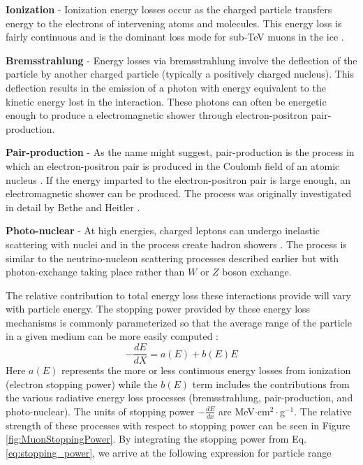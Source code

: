 \documentclass{gatech-thesis}
\begin{document}
\begin{adjustwidth}{2.5em}{2.5em}
\setlength{\parindent}{0pt}
\textbf{Ionization} - Ionization energy losses occur as the charged particle transfers energy to the electrons of intervening atoms and molecules. This energy loss is fairly continuous and is the dominant loss mode for sub-TeV muons in the ice \cite{2001ADNDT..78..183G}.

\textbf{Bremsstrahlung} - Energy losses via bremsstrahlung involve the deflection of the particle by another charged particle (typically a positively charged nucleus). This deflection results in the emission of a photon with energy equivalent to the kinetic energy lost in the interaction. These photons can often be energetic enough to produce a electromagnetic shower through electron-positron pair-production.

\textbf{Pair-production} - As the name might suggest, pair-production is the process in which an electron-positron pair is produced in the Coulomb field of an atomic nucleus \cite{2001ADNDT..78..183G}. If the energy imparted to the electron-positron pair is large enough, an electromagnetic shower can be produced. The process was originally investigated in detail by Bethe and Heitler \cite{BetheHeitler}.

\textbf{Photo-nuclear} - At high energies, charged leptons can undergo inelastic scattering with nuclei and in the process create hadron showers \cite{2003PhRvD..67c4027B}. The process is similar to the neutrino-nucleon scattering processes described earlier but with photon-exchange taking place rather than $W$ or $Z$ boson exchange.
\end{adjustwidth}
\setlength{\parindent}{17.5pt}
The relative contribution to total energy loss these interactions provide will vary with particle energy. The stopping power provided by these energy loss mechanisms is commonly parameterized so that the average range of the particle in a given medium can be more easily computed \cite{2001ADNDT..78..183G}:
\begin{equation}\label{eq:stopping_power}
-\frac{dE}{dX} = a(E) + b(E) E
\end{equation}
Here $a(E)$ represents the more or less continuous energy losses from ionization (electron stopping power) while the $b(E)$ term includes the contributions from the various radiative energy loss processes (bremsstrahlung, pair-production, and photo-nuclear). The units of stopping power $-\frac{dE}{dx}$ are MeV$\cdot$cm$^2 \cdot$g$^{-1}$. The relative strength of these processes with respect to stopping power can be seen in Figure \ref{fig:MuonStoppingPower}. By integrating the stopping power from Eq. \ref{eq:stopping_power}, we arrive at the following expression for particle range
\end{document}
